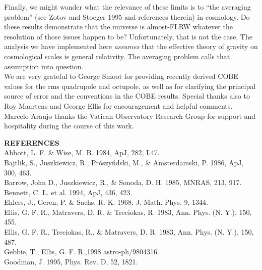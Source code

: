 Finally, we might wonder what the relevance of these limits is to ``the
averaging problem'' (see Zotov and Stoeger 1995 and references therein) in
cosmology. Do these results demonstrate that the universe is almost-FLRW
whatever the resolution of those issues happen to be? Unfortunately,
that is not the case. The analysis we have implemented here {\it assumes}
that the effective theory of gravity on cosmological scales is general
relativity. The averaging problem calls that assumption into question. \\

We are very grateful to George Smoot for providing recently derived COBE
values for the rms quadrupole and octupole, as well as for clarifying 
the principal source of error and the conventions in the COBE results. Special
thanks also to Roy Maartens and George Ellis for encouragement and helpful
comments. Marcelo Araujo thanks the Vatican Observatory Research Group
for support and hospitality during the course of this work.\\

\newpage

\noindent
{\bf REFERENCES} \\

\noindent
Abbott, L. F. \& Wise, M. B. 1984, ApJ, 282, L47. \\

\noindent
Bajtlik, S., Juszkiewicz, R., Pr\'{o}szy\'{n}dski, M., \& Amsterdamski, P.
1986, ApJ, 300, 463. \\

\noindent
Barrow, John D., Juszkiewicz, R., \& Sonoda, D. H. 1985, MNRAS, 213, 917. \\

\noindent
Bennett, C. L. et al. 1994, ApJ, 436, 423. \\

\noindent
Ehlers, J., Geren, P. \& Sachs, R. K. 1968, J. Math. Phys. 9, 1344. \\

\noindent
Ellis, G. F. R., Matravers, D. R. \& Treciokas, R. 1983, Ann. Phys. (N. Y.),
150, 455. \\

\noindent
Ellis, G. F. R., Treciokas, R., \& Matravers, D. R. 1983, Ann. Phys. (N. Y.),
150, 487. \\

\noindent
Gebbie, T., Ellis, G. F. R.,1998 astro-ph/9804316. \\

\noindent
Goodman, J. 1995, Phys. Rev. D, 52, 1821. \\

